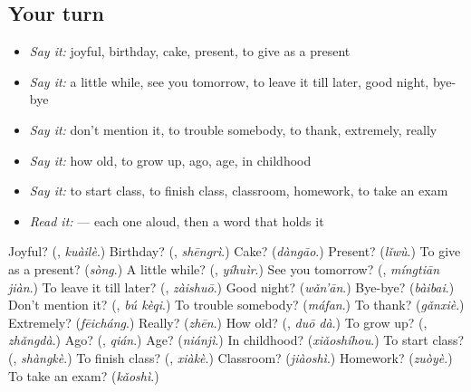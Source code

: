 \subsection*{Your turn}
\begin{itemize}
\raggedright
  \item \emph{Say it:} joyful, birthday, cake, present, to give as a present
  \item \emph{Say it:} a little while, see you tomorrow, to leave it till later, good night, bye-bye
  \item \emph{Say it:} don't mention it, to trouble somebody, to thank, extremely, really
  \item \emph{Say it:} how old, to grow up, ago, age, in childhood
  \item \emph{Say it:} to start class, to finish class, classroom, homework, to take an exam
  \item \emph{Read it:}     — each one aloud, then a word that holds it
\end{itemize}

\begin{tcolorbox}[breakable,colback=teal!4,colframe=teal!35!black,title={Before you move on}]
Joyful? (\textbf{}, \emph{kuàilè}.) Birthday? (\textbf{}, \emph{shēngrì}.) Cake? (\emph{dàngāo}.) Present? (\emph{lǐwù}.) To give as a present? (\emph{sòng}.) A little while? (\textbf{}, \emph{yíhuìr}.) See you tomorrow? (\textbf{}, \emph{míngtiān jiàn}.) To leave it till later? (\textbf{}, \emph{zàishuō}.) Good night? (\emph{wǎn'ān}.) Bye-bye? (\emph{bàibai}.) Don't mention it? (\textbf{}, \emph{bú kèqi}.) To trouble somebody? (\emph{máfan}.) To thank? (\emph{gǎnxiè}.) Extremely? (\emph{fēicháng}.) Really? (\emph{zhēn}.) How old? (\textbf{}, \emph{duō dà}.) To grow up? (\textbf{}, \emph{zhǎngdà}.) Ago? (\textbf{}, \emph{qián}.) Age? (\emph{niánjì}.) In childhood? (\emph{xiǎoshíhou}.) To start class? (\textbf{}, \emph{shàngkè}.) To finish class? (\textbf{}, \emph{xiàkè}.) Classroom? (\emph{jiàoshì}.) Homework? (\emph{zuòyè}.) To take an exam? (\emph{kǎoshì}.)
\end{tcolorbox}
